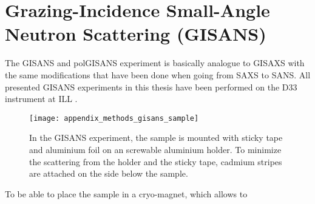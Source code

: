 \documentclass[\main/dresen_thesis.tex]{subfiles}
\begin{document}
  \section{Grazing-Incidence Small-Angle Neutron Scattering (GISANS)}
    \label{app:methods:gisans}
    The GISANS and polGISANS experiment is basically analogue to GISAXS with the same modifications that have been done when going from SAXS to SANS.
    All presented GISANS experiments in this thesis have been performed on the D33 instrument at ILL .
    \begin{figure}[tb]
      \centering
      \texttt{[image: appendix\_methods\_gisans\_sample]}
      \caption{\label{fig:appendix:methods:saxs:samples}In the GISANS experiment, the sample is mounted with sticky tape and aluminium foil on an screwable aluminium holder. To minimize the scattering from the holder and the sticky tape, cadmium stripes are attached on the side below the sample.}
    \end{figure}

    To be able to place the sample in a cryo-magnet, which allows to 
\end{document}
